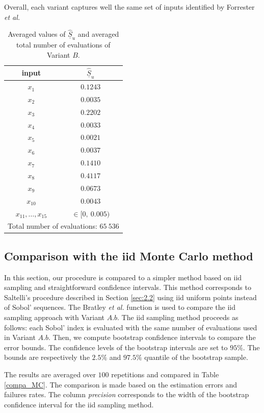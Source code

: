 Overall, each variant captures well the same set of  inputs identified by Forrester \textit{et al.}
\begin{table}[t]
\caption{Averaged values of $\widehat{\underline{S}}_u$ and averaged total number of evaluations of Variant $B$.}
 \centering
\begin{tabular}{cc}
\hline
 input & $\widehat{\underline{S}}_u$ \\ \hline
 $x_1$ & $0.1243$ \\ \hline
 $x_2$ & $0.0035$ \\ \hline
 $x_3$ & $0.2202$ \\ \hline
 $x_4$ & $0.0033$ \\ \hline
 $x_5$ & $0.0021$ \\ \hline
 $x_6$ & $0.0037$ \\ \hline 
 $x_7$ & $0.1410$ \\ \hline
 $x_8$ & $0.4117$ \\ \hline
 $x_9$ & $0.0673$ \\ \hline
 $x_{10}$ & $0.0043$ \\ \hline
 $x_{11},\dots,x_{15}$ & $\in [0,\ 0.005)$ \\ \hline
 \hline
\multicolumn{2}{l}{Total number of evaluations: $65 \ 536$} \\ \hline 
\end{tabular}
\label{res.wing.B}
\end{table}

\subsection{Comparison with the iid Monte Carlo method}

In this section, our procedure is compared to a simpler \break method based on iid sampling and straightforward confidence intervals. This method corresponds to Saltelli's procedure described in Section \ref{sec:2.2} using iid uniform points instead of Sobol' sequences. The Bratley \textit{et al.} function is used to compare the iid sampling approach with Variant $A.b$. The iid sampling method proceeds as follows: each Sobol' index is evaluated with the same number of evaluations used in Variant $A.b$. Then, we compute bootstrap confidence intervals to compare the error bounds. The confidence levels of the bootstrap intervals are set to $95\%$. The bounds are respectively the $2.5\%$ and $97.5\%$ quantile of the bootstrap sample.  

The results are averaged over $100$ repetitions and compared in Table \ref{compa_MC}. The comparison is made based on the estimation errors and failures rates. The column \textit{precision} corresponds to the width of the bootstrap confidence interval for the iid sampling method.


